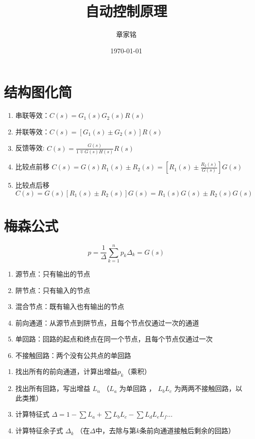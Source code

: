 \documentclass[UTF8]{ctexart}
\title{自动控制原理}
\author{章家铭}
\date{\today}
\begin{document}
    \maketitle

    \section{结构图化简}
    
    \begin{enumerate}
        \item 串联等效：$C(s) = G_1(s) G_2(s) R(s)$
        \item 并联等效：$C(s) = [G_1(s) \pm G_2(s)]R(s)$
        \item 反馈等效: $C(s) = \frac{G(s)}{1 \mp G(s)H(s)} R(s)$
        \item 比较点前移 $C(s) = G(s)R_1(s) \pm R_2(s) = [R_1(s) \pm \frac{R_2(s)}{G(s)}]G(s)$
        \item 比较点后移 $C(s) = G(s)[R_1(s) \pm R_2(s)]G(s) = R_1(s)G(s) \pm R_2(s)G(s)$
    \end{enumerate}
    
    \section{梅森公式}

    \begin{equation*}
        p = \frac{1}{\Delta} \sum_{k = 1}^{ n } p_k \Delta_k =G(s)
    \end{equation*}

    \begin{tcolorbox}[green]
    \begin{enumerate}
        \item 源节点：只有输出的节点
        \item 阱节点：只有输入的节点
        \item 混合节点：既有输入也有输出的节点
        \item 前向通道：从源节点到阱节点，且每个节点仅通过一次的通道
        \item 单回路：回路的起点和终点在同一个节点，且每个节点仅通过一次
        \item 不接触回路：两个没有公共点的单回路
    \end{enumerate}
    \end{tcolorbox}

    \begin{enumerate}
        \item 找出所有的前向通道，计算出增益$p_k$（乘积）
        \item 找出所有回路，写出增益 $L_n$  （$L_a$ 为单回路 ， $L_b L_c$ 为两两不接触回路，以此类推）
        \item 计算特征式 $\Delta = 1 - \sum L_a + \sum L_b L_c - \sum L_d L_e L_f  ...$
        \item 计算特征余子式 $\Delta_k$ （在$\Delta$中，去除与第$k$条前向通道接触后剩余的回路）
    \end{enumerate}
\end{document}
